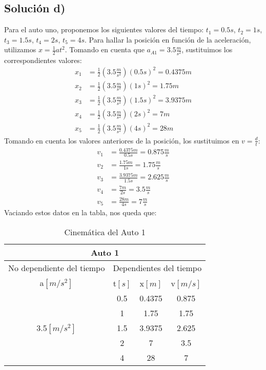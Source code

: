 \documentclass[letterpaper,12pt]{article}
\begin{document}
\begin{enumerate}
\subsection*{Solución d)}
Para el auto uno, proponemos los siguientes valores del tiempo: $t_1 = 0.5 s$, $t_2 = 1 s$, $t_3 = 1.5 s$, $t_4 = 2 s$, $t_5 = 4 s$. Para hallar la posición en función de la aceleración, utilizamos $x=\frac{1}{2} at^2$. Tomando en cuenta que $a_{A1}=3.5 \tfrac{m}{s^2}$, sustituimos los correspondientes valores:
\begin{align*}
    x_{1}&=\frac{1}{2}(3.5 \tfrac{m}{s^2})(0.5 s)^2 = 0.4375 m \\
    x_{2}&=\frac{1}{2}(3.5 \tfrac{m}{s^2})(1 s)^2 = 1.75 m\\
    x_{3}&=\frac{1}{2}(3.5 \tfrac{m}{s^2})(1.5 s)^2 = 3.9375 m\\
    x_{4}&=\frac{1}{2}(3.5 \tfrac{m}{s^2})(2 s)^2 = 7 m\\
    x_{5}&=\frac{1}{2}(3.5 \tfrac{m}{s^2})(4 s)^2 = 28 m
\end{align*}
Tomando en cuenta los valores anteriores de la posición, los sustituimos en $v=\frac{d}{t}$:
\begin{align*}
    v_{1}&=\frac{0.4375 m}{0.5 s}= 0.875 \tfrac{m}{s}\\
    v_{2}&=\frac{1.75 m}{1 s}= 1.75 \tfrac{m}{s}\\
    v_{3}&=\frac{3.9375 m}{1.5 s}= 2.625 \tfrac{m}{s}\\
    v_{4}&=\frac{7 m}{2 s}= 3.5 \tfrac{m}{s}\\
    v_{5}&=\frac{28 m}{4 s}= 7 \tfrac{m}{s}
\end{align*}
Vaciando estos datos en la tabla, nos queda que:
\begin{table}[h]
\begin{center}
\begin{tabular}{ c | c | c | c | c |c }
\hline \hline
    \multicolumn{6}{c}{Auto 1} \\ \hline 
    \multicolumn{3}{c}{No dependiente del tiempo} & \multicolumn{3}{|c}{Dependientes del tiempo} \\ \hline
    \multicolumn{3}{c|}{a$[m/s^2]$} & t$[s]$ & x$[m]$ & v$[m/s]$\\ \hline
    \multicolumn{3}{c|}{\multirow{5}{*}{3.5$[m/s^2]$}}  & 0.5 & 0.4375 & 0.875 \tabularnewline \cline{4-6}
    \multicolumn{3}{c|}{\multirow{5}{*}{}}  & 1 & 1.75 & 1.75 \tabularnewline \cline{4-6}
    \multicolumn{3}{c|}{}  & 1.5 & 3.9375 & 2.625 \tabularnewline \cline{4-6}
    \multicolumn{3}{c|}{}  & 2 & 7 & 3.5 \tabularnewline \cline{4-6}
    \multicolumn{3}{c|}{}  & 4 & 28 & 7 \\ \hline \hline
\end{tabular}
\caption{Cinemática del Auto 1}
\label{tab:coches}
\end{center}
\end{table}



\end{enumerate}
\end{document}
